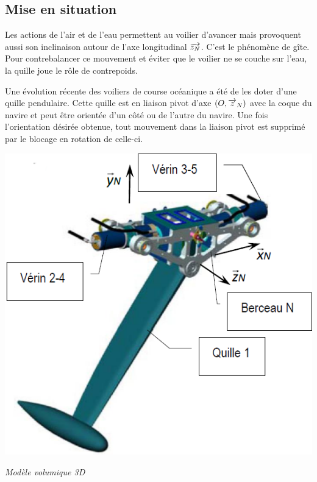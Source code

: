 \documentclass[10pt,fleqn]{article} %
\begin{document}

\vspace{4.5cm}
\pagestyle{fancy}
\thispagestyle{plain}


\def\columnseprulecolor{\color{ocre}}
\setlength{\columnseprule}{0.4pt} 

\ifprof
\else
\begin{multicols}{2}
\fi


\section*{Mise en situation}
\ifprof
\else

Les actions de l'air et de l'eau permettent au voilier d'avancer mais provoquent aussi son inclinaison autour de l'axe longitudinal $\overrightarrow{z_N}$. C’est le phénomène de gîte. Pour contrebalancer ce mouvement et éviter que le voilier ne se couche sur l’eau, la quille joue le rôle de contrepoids. 



Une évolution récente des voiliers de course océanique a été de les doter d’une quille pendulaire. Cette quille est en liaison pivot d’axe $\left(O,\overrightarrow{z}_N \right)$ avec la coque du navire et peut être orientée d’un côté ou de l’autre du navire. Une fois l’orientation désirée obtenue, tout mouvement dans la liaison pivot est supprimé par le blocage en rotation de celle-ci. 

\begin{center}
\includegraphics[width=.6\linewidth]{images/fig_03}

\textit{Modèle volumique 3D}
\end{center}



\end{multicols}
\end{document}
